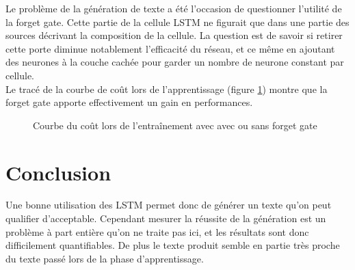 Le problème de la génération de texte a été l'occasion de questionner l'utilité de la forget gate. Cette partie de la cellule LSTM ne figurait que dans une partie des sources décrivant la composition de la cellule.
La question est de savoir si retirer cette porte diminue notablement l'efficacité du réseau, et ce même en ajoutant des neurones à la couche cachée pour garder un nombre de neurone constant par cellule.
\\ Le tracé de la courbe de coût lors de l'apprentissage (figure \ref{forget_gate}) montre que la forget gate apporte effectivement un gain en performances.

\begin{figure}[H]
\centering
{}
\caption{Courbe du coût lors de l'entraînement avec avec ou sans forget gate}
\label{forget_gate}
\end{figure}


\section{Conclusion}
Une bonne utilisation des LSTM permet donc de générer un texte qu'on peut qualifier d'acceptable. Cependant mesurer la réussite de la génération est un problème à part entière qu'on ne traite pas ici, et les résultats sont donc difficilement quantifiables. De plus le texte produit semble en partie très proche du texte passé lors de la phase d'apprentissage.


